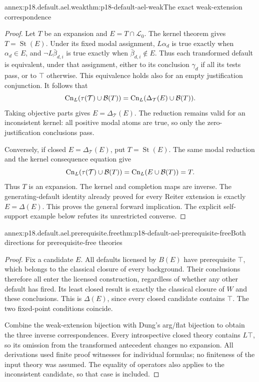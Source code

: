 \begin{annexitem}{annex:p18.default.ael.weak}{thm:p18-default-ael-weak}{The exact weak-extension correspondence}
\begin{proof}
Let \(T\) be an expansion and
\(E=T\cap\mathcal L_0\).
The kernel theorem gives
\(T=\operatorname{St}(E)\).
Under its fixed modal
assignment, \(L\alpha_d\)
is true exactly when
\(\alpha_d\in E\), and
\(\neg L\bar\beta_{d,i}\)
is true exactly when
\(\bar\beta_{d,i}\notin E\).
Thus each transformed
default is equivalent,
under that assignment,
either to its conclusion
\(\gamma_d\) if all its
tests pass, or to
\(\top\) otherwise.
This equivalence holds
also for an empty
justification conjunction.
It follows that
\[
 \operatorname{Cn}_L(\tau(\mathcal T)\cup{\cal B}(T))
 =\operatorname{Cn}_L(\Delta_{\mathcal T}(E)\cup{\cal B}(T)).
\]
Taking objective parts
gives \(E=\Delta_{\mathcal T}(E)\).
The reduction remains
valid for an inconsistent
kernel: all positive modal
atoms are true, so only
the zero-justification
conclusions pass.

Conversely, if closed
\(E=\Delta_{\mathcal T}(E)\),
put \(T=\operatorname{St}(E)\).
The same modal reduction
and the kernel consequence
equation give
\[
 \operatorname{Cn}_L(\tau(\mathcal T)\cup{\cal B}(T))
 =\operatorname{Cn}_L(E\cup{\cal B}(T))=T.
\]
Thus \(T\) is an expansion.
The kernel and completion
maps are inverse.
The generating-default
identity already proved
for every Reiter extension
is exactly \(E=\Delta(E)\).
This proves the general
forward implication.
The explicit self-support
example below refutes
its unrestricted converse.
\end{proof}
\end{annexitem}

\begin{annexitem}{annex:p18.default.ael.prerequisite.free}{thm:p18-default-ael-prerequisite-free}{Both directions for prerequisite-free theories}
\begin{proof}
Fix a candidate \(E\).
All defaults licensed by
\(B(E)\) have prerequisite
\(\top\), which belongs
to the classical closure
of every background.
Their conclusions therefore
all enter the licensed
construction, regardless
of whether any other
default has fired.
Its least closed result
is exactly the classical
closure of \(W\) and
these conclusions.
This is \(\Delta(E)\),
since every closed
candidate contains \(\top\).
The two fixed-point
conditions coincide.

Combine the weak-extension
bijection with Dung's
arg/flat bijection to
obtain the three inverse
correspondences. Every
introspective closed theory
contains \(L\top\), so
its omission from the
transformed antecedent
changes no expansion.
All derivations used
finite proof witnesses
for individual formulas;
no finiteness of the
input theory was assumed.
The equality of operators
also applies to the
inconsistent candidate,
so that case is included.
\end{proof}
\end{annexitem}

